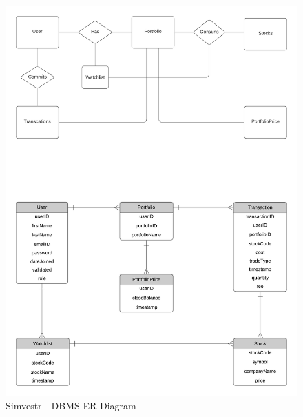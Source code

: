 \begin{figure}[htp]
    \centering
    \includegraphics[scale = .8]{./5_architecture/DBMS ER diagram.png}
    \caption{Simvestr - DBMS ER Diagram}
    \label{fig:DBMS}
\end{figure}
